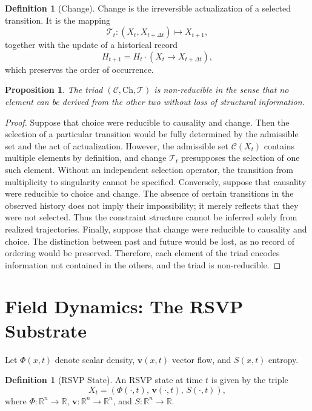 \documentclass[11pt,a4paper]{article}
\newtheorem{proposition}[theorem]{Proposition}
\theoremstyle{definition}
\newtheorem{definition}[theorem]{Definition}
\theoremstyle{remark}
\begin{document}
\begin{definition}[Change]
Change is the irreversible actualization of a selected transition. It is the mapping
\[
\mathcal{T}_t : (X_t, X_{t+\Delta t}) \mapsto X_{t+1},
\]
together with the update of a historical record
\[
H_{t+1} = H_t \cdot (X_t \rightarrow X_{t+\Delta t}),
\]
which preserves the order of occurrence.
\end{definition}

\begin{proposition}
The triad $(\mathcal{C}, \mathrm{Ch}, \mathcal{T})$ is non-reducible in the sense that no element can be derived from the other two without loss of structural information.
\end{proposition}

\begin{proof}
Suppose that choice were reducible to causality and change. Then the selection of a particular transition would be fully determined by the admissible set and the act of actualization. However, the admissible set $\mathcal{C}(X_t)$ contains multiple elements by definition, and change $\mathcal{T}_t$ presupposes the selection of one such element. Without an independent selection operator, the transition from multiplicity to singularity cannot be specified. Conversely, suppose that causality were reducible to choice and change. The absence of certain transitions in the observed history does not imply their impossibility; it merely reflects that they were not selected. Thus the constraint structure cannot be inferred solely from realized trajectories. Finally, suppose that change were reducible to causality and choice. The distinction between past and future would be lost, as no record of ordering would be preserved. Therefore, each element of the triad encodes information not contained in the others, and the triad is non-reducible.
\end{proof}

\section{Field Dynamics: The RSVP Substrate}

Let $\Phi(x,t)$ denote scalar density, $\mathbf{v}(x,t)$ vector flow, and $S(x,t)$ entropy.

\begin{definition}[RSVP State]
An RSVP state at time $t$ is given by the triple
\[
X_t = (\Phi(\cdot,t),\, \mathbf{v}(\cdot,t),\, S(\cdot,t)),
\]
where $\Phi : \mathbb{R}^n \to \mathbb{R}$, $\mathbf{v} : \mathbb{R}^n \to \mathbb{R}^n$, and $S : \mathbb{R}^n \to \mathbb{R}$.
\end{definition}
\end{document}
